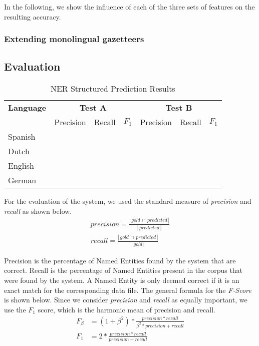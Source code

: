 \documentclass[11pt]{article}
\begin{document}
In the following, we show the influence of each of the three sets of features on the resulting accuracy.


\subsubsection{Extending monolingual gazetteers}



\subsection{Evaluation}

\begin{table*}[t]
\centering
\begin{tabular}{| l | l l l| l l l |}

\hline
\bf Language & \multicolumn{3}{c|}{ \bf Test A}&\multicolumn{3}{c|}{ \bf Test B}\\
             & Precision & Recall & $F_1$ & Precision & Recall & $F_1$ \\ \hline
Spanish &       &          &     &          &               & \\
Dutch  &         &          &     &          &               &   \\
English &        &          &     &          &               &       \\
German &      &          &       &          &             & \\
\hline
\end{tabular}
\caption{NER Structured Prediction Results }
\label{table:Results}
\end{table*}

For the evaluation of the system, we used the standard measure of \emph{precision} and \emph{recall} as shown below.
\begin{align*}
     precision =  \frac{  |\,gold\,\cap\,predicted\,| }{ |\,predicted\,| } \\
     recall = \frac{ |\,gold\,\cap\,predicted\,| }{ |\,gold\,| }
\end{align*}

Precision is the percentage of Named Entities found by the system that are correct. Recall is the percentage of Named Entities present in the corpus that were 
found by the system. A Named Entity is only deemed correct if it is an exact match for the corresponding data file. The general formula for the \emph{F-Score} 
is shown below. Since we consider \emph{precision} and \emph{recall} as equally important, we use the $F_{1}$ score, which is the harmonic mean of precision and recall.
\begin{align*}
  F_{\beta} &=  (1+\beta^2)*\frac{precision *recall}{\beta^2* precision + recall}\\
  F_1       &= 2*\frac{precision *recall}{precision + recall}\\
\end{align*}
\end{document}
